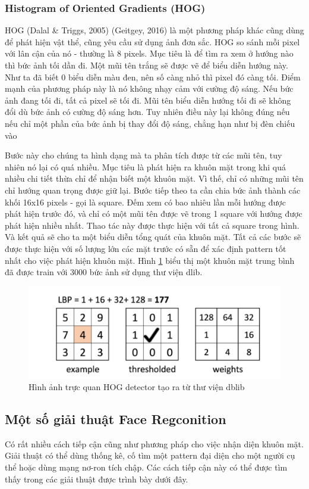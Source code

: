 \documentclass[a4paper]{report}
\begin{document}
\subsubsection{Histogram of Oriented Gradients (HOG)}
HOG (Dalal \& Triggs, 2005) (Geitgey, 2016) là một phương pháp khác cũng dùng để phát hiện vật thể, cũng yêu cầu sử dụng ảnh đơn sắc. HOG so sánh mỗi pixel với lân cận của nó - thường là 8 pixels. Mục tiêu là để tìm ra xem ở hướng nào thì bức ảnh tối dần đi. Một mũi tên trắng sẽ được vẽ để biểu diễn hướng này. Như ta đã biết 0 biểu diễn màu đen, nên số càng nhỏ thì pixel đó càng tối. Điểm mạnh của phương pháp này là nó không nhạy cảm với cường độ sáng. Nếu bức ảnh đang tối đi, tất cả pixel sẽ tối đi. Mũi tên biểu diễn hướng tối đi sẽ không đổi dù bức ảnh có cường độ sáng hơn. Tuy nhiên điều này lại không đúng nếu nếu chỉ một phần của bức ảnh bị thay đổi độ sáng, chẳng hạn như bị đèn chiếu vào
\par\noindent
Bước này cho chúng ta hình dạng mà ta phân tích được từ các mũi tên, tuy nhiên nó lại có quá nhiều. Mục tiêu là phát hiện ra khuôn mặt trong khi quá nhiều chi tiết thừa chỉ để nhận biết một khuôn mặt. Vì thế, chỉ có những mũi tên chỉ hướng quan trọng được giữ lại. Bước tiếp theo ta cần chia bức ảnh thành các khối 16x16 pixels - gọi là square. Đếm xem có bao nhiêu lần mỗi hướng được phát hiện trước đó, và chỉ có một mũi tên được vẽ trong 1 square với hướng được phát hiện nhiều nhất. Thao tác này được thực hiện với tất cả square trong hình. Và kết quả sẽ cho ta một biểu diễn tổng quát của khuôn mặt. Tất cả các bước sẽ được thực hiện với số lượng lớn các mặt trước có sẵn để xác định pattern tốt nhất cho việc phát hiện khuôn mặt. Hình \ref{fig:2.13} biểu thị một khuôn mặt trung bình đã được train với 3000 bức ảnh sử dụng thư viện dlib.
%
\begin{figure}[H]
\centering
\includegraphics[width=.5\textwidth]{../images/fig/2-14.png}
\caption{Hình ảnh trực quan HOG detector tạo ra từ thư viện dblib}
\label{fig:2.13}
\end{figure}
%
\subsection{Một số giải thuật Face Regconition}
Có rất nhiều cách tiếp cận cũng như phương pháp cho việc nhận diện khuôn mặt. Giải thuật có thể dùng thống kê, cố tìm một pattern đại diện cho một người cụ thể hoặc dùng mạng nơ-ron tích chập. Các cách tiếp cận này có thể được tìm thấy trong các giải thuật được trình bày dưới đây.
\end{document}
